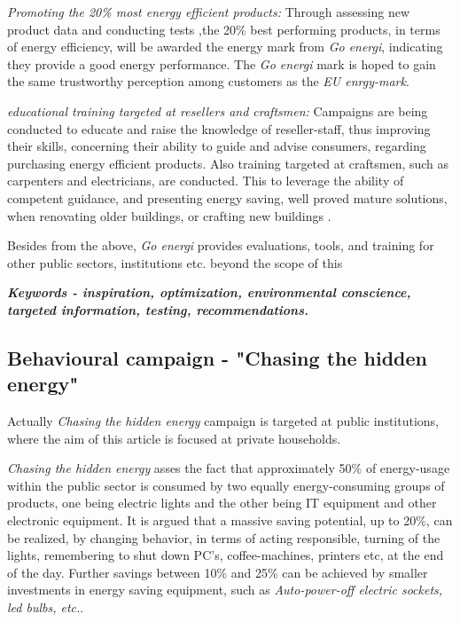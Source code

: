 \documentclass[journal]{IEEEtran}
\begin{document}
\textit{Promoting the 20\% most energy efficient products:} Through assessing new product data and conducting tests ,the 20\% best performing products, in terms of energy efficiency, will be awarded the energy mark from \textit{Go energi}, indicating they provide a good energy performance. The \textit{Go energi} mark is hoped to gain the same trustworthy perception among customers as the \textit{EU enrgy-mark}. 

\textit{educational training targeted at resellers and craftsmen:} Campaigns are being conducted to educate and raise the knowledge of reseller-staff, thus 
improving their skills, concerning their ability to guide and advise consumers, regarding purchasing energy efficient products.
Also training targeted at craftsmen, such as carpenters and electricians, are conducted. This to leverage the ability of competent guidance, and presenting energy saving, well proved mature solutions, when renovating older buildings, or crafting new buildings \cite{annual_ens_11}.  

Besides from the above, \textit{Go energi} provides evaluations, tools, and training for other public sectors, institutions etc. beyond the scope of this \newline

\textbf{\textit{Keywords - inspiration, optimization, environmental conscience, targeted information, testing, recommendations.}}

\subsection{Behavioural campaign - "Chasing the hidden energy"}
Actually \textit{Chasing the hidden energy} campaign is targeted at public institutions, where the aim of this article is focused at private households. 

\textit{Chasing the hidden energy} asses the fact that approximately 50\% of energy-usage within the public sector is consumed by two equally energy-consuming groups of products, one being electric lights and the other being IT equipment and other electronic equipment\cite{bk_2004}.
It is argued that a massive saving potential, up to 20\%, can be realized, by changing behavior, in terms of acting responsible, turning of the lights, remembering to shut down PC's, coffee-machines, printers etc, at the end of the day. 
Further savings between 10\% and 25\% can be achieved by smaller investments in energy saving equipment, such as \textit{Auto-power-off electric sockets, led bulbs, etc.}\cite{hidden_e}. 
\end{document}
